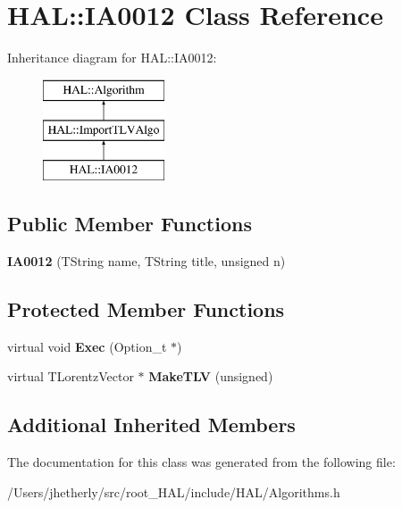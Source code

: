 \hypertarget{class_h_a_l_1_1_i_a0012}{\section{H\-A\-L\-:\-:I\-A0012 Class Reference}
\label{class_h_a_l_1_1_i_a0012}
}
Inheritance diagram for H\-A\-L\-:\-:I\-A0012\-:\begin{figure}[H]
\begin{center}
\leavevmode
\includegraphics[height=3.000000cm]{class_h_a_l_1_1_i_a0012}
\end{center}
\end{figure}
\subsection*{Public Member Functions}
\begin{DoxyCompactItemize}
\item 
\hypertarget{class_h_a_l_1_1_i_a0012_ab22ce5f648311cc495f8430984edab3f}{{\bfseries I\-A0012} (T\-String name, T\-String title, unsigned n)}\label{class_h_a_l_1_1_i_a0012_ab22ce5f648311cc495f8430984edab3f}

\end{DoxyCompactItemize}
\subsection*{Protected Member Functions}
\begin{DoxyCompactItemize}
\item 
\hypertarget{class_h_a_l_1_1_i_a0012_a94f7cb9185c6f2740357f4ae322dcb0a}{virtual void {\bfseries Exec} (Option\-\_\-t $\ast$)}\label{class_h_a_l_1_1_i_a0012_a94f7cb9185c6f2740357f4ae322dcb0a}

\item 
\hypertarget{class_h_a_l_1_1_i_a0012_aa5014a116be85bc72b2ab11a08a65f3b}{virtual T\-Lorentz\-Vector $\ast$ {\bfseries Make\-T\-L\-V} (unsigned)}\label{class_h_a_l_1_1_i_a0012_aa5014a116be85bc72b2ab11a08a65f3b}

\end{DoxyCompactItemize}
\subsection*{Additional Inherited Members}


The documentation for this class was generated from the following file\-:\begin{DoxyCompactItemize}
\item 
/\-Users/jhetherly/src/root\-\_\-\-H\-A\-L/include/\-H\-A\-L/Algorithms.\-h\end{DoxyCompactItemize}
